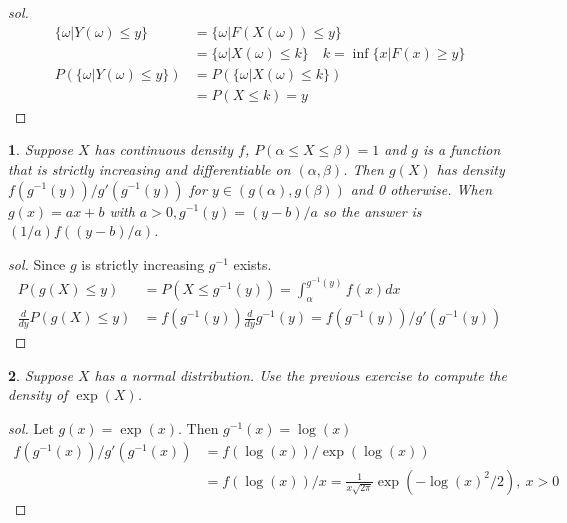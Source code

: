 \documentclass{report}
\newtheorem{ex}{}[section]
\begin{document}
\begin{proof}[sol]
\begin{align*}
    \{\omega | Y(\omega) \le y\} &= \{\omega | F(X(\omega)) \le y\}\\
    &= \{\omega | X(\omega) \le k\} \quad k = \inf\{x | F(x) \ge y \}\\
    P(\{\omega | Y(\omega) \le y\}) &= P(\{\omega | X(\omega) \le k\})\\
    &= P(X \le k) = y
\end{align*}
\end{proof}
\begin{ex}
Suppose $X$ has continuous density $f$, $P(\alpha \le X \le \beta) = 1$ and $g$ is a function that is strictly increasing and differentiable on $(\alpha, \beta)$. Then $g(X)$ has density $f(g^{-1}(y))/g'(g^{-1}(y))$ for $y \in (g(\alpha), g(\beta))$ and 0 otherwise. When $g(x) = ax + b$ with $a > 0, g^{-1}(y) = (y - b)/a$ so the answer is $(1/a)f((y - b)/a)$.
\end{ex}
\begin{proof}[sol]
Since $g$ is strictly increasing $g^{-1}$ exists.
\begin{align*}
    P(g(X) \le y) &= P(X \le g^{-1}(y)) = \int_\alpha^{g^{-1}(y)} f(x)dx\\
    \frac{d}{dy}P(g(X) \le y) &= f(g^{-1}(y))\frac{d}{dy}g^{-1}(y) = f(g^{-1}(y))/g'(g^{-1}(y))
\end{align*}
\end{proof}
\begin{ex}
Suppose $X$ has a normal distribution. Use the previous exercise to compute the density of $\exp(X)$.
\end{ex}
\begin{proof}[sol]
Let $g(x) = \exp(x)$. Then $g^{-1}(x) = \log(x)$
\begin{align*}
    f(g^{-1}(x))/g'(g^{-1}(x)) &= f(\log(x))/\exp(\log(x))\\
    &= f(\log(x))/x = \frac{1}{x\sqrt{2\pi}}\exp(-\log(x)^2/2), \ x > 0
\end{align*}
\end{proof}
\end{document}
